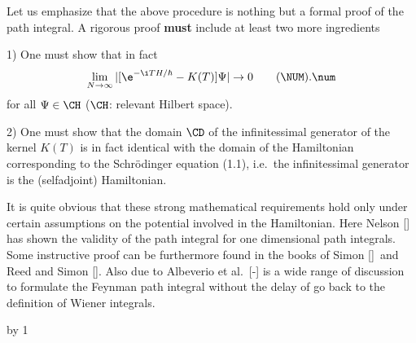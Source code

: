 Let us emphasize that the above procedure is nothing but a formal proof
of the path integral. A rigorous proof {\bf must} include at least two
more ingredients
\item{1)}
One must show that in fact
\plus
$$\lim_{N\to\infty}\vert [\e^{-\i TH/\hbar}-K(T)]\Psi\vert\to0
  \tag\NUM.\num$$
for all $\Psi\in\CH$ ($\CH$: relevant Hilbert space).
\item{2)}
One must show that the domain $\CD$ of the infinitessimal
generator of the kernel $K(T)$ is in fact identical
with the domain of the Hamiltonian corresponding to the Schr\"odinger
equation (1.1), i.e.\ the infinitessimal generator is the
(selfadjoint) Hamiltonian.

\bigskip\noindent
It is quite obvious that these strong mathematical requirements hold
only under certain assumptions on the potential involved in the
Hamiltonian.
Here Nelson [\NELb] has shown the validity of the path
integral for one dimensional path integrals.
Some instructive proof can be furthermore found in the books
of Simon [\SIMON]\ and Reed and Simon [\RS].
Also due to Albeverio et al.\ [\ALB-\ACHRS] is
a wide range of discussion to formulate the Feynman path integral
without the delay of go back to the definition of Wiener integrals.

\bigskip\bigskip
{}               %
\advance\chapno by 1  %
\def\Kapitel{II.\NUM}
\def\Section{Product-Ordering}
